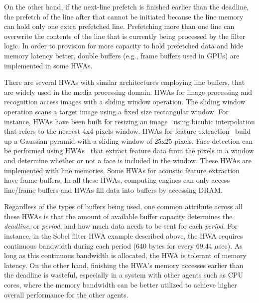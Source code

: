 \documentclass[10pt,letterpaper]{article}
\newcommand{\TMP}[1]{#1}
\newif\ifSQUEEZE
\begin{document}
On the other hand, if the next-line prefetch is finished earlier
than the deadline, the prefetch of the line after that cannot be
initiated because the line memory can hold only one extra
prefetched line. Prefetching more than one line can overwrite the
contents of the line that is currently being processed by the
filter logic. 
\TMP{In order to provision for more capacity to hold prefetched
data and hide memory latency better, double buffers (e.g., frame buffers used in
GPUs) are implemented in some HWAs.}


\ifSQUEEZE
There are several HWAs with similar architectures employing line/frame
buffers, which are widely used in the media processing domain. 
HWAs for resizing an image~\cite{resizing} or feature extraction~\cite{HWA_sift,HWA_face}
use line buffers. HWAs for acoustic feature extraction~\cite{HWA_acoustic} use frame buffers. 
In all these HWAs, computing engines can only access line/frame
buffers and data is prefetched into these buffers from main
memory.
\else
There are several HWAs with similar architectures employing line buffers, that
are widely used in the media processing domain. HWAs for image processing and
recognition access images with a sliding window operation. The sliding window
operation scans a target image using a fixed size rectangular window. For
instance, HWAs have been built for resizing an image~\cite{resizing} using
bicubic interpolation that refers to the nearest 4x4 pixels window. HWAs for
feature extraction~\cite{HWA_sift} build up a Gaussian pyramid with a sliding
window of 25x25 pixels. Face detection can be performed using
HWAs~\cite{HWA_face} that extract feature data from the pixels in a window and
determine whether or not a face is included in the window. These HWAs are
implemented with line memories. Some HWAs for acoustic feature
extraction~\cite{HWA_acoustic} have frame buffers. In all these HWAs, computing
engines can only access line/frame buffers and HWAs fill data into buffers by
accessing DRAM.
\fi

Regardless of the types of buffers being used, one common
attribute across all these HWAs is that the amount of available
buffer capacity determines the \emph{deadline}, or \emph{period}, and how much
data needs to be sent for each \emph{period}. For instance, in
the Sobel filter HWA example described above, the HWA requires
continuous bandwidth during each period (640 bytes for every 69.44
$\mu$sec). As long as this continuous bandwidth is allocated,
the HWA is tolerant of memory latency. On the other hand, finishing the
HWA's memory accesses earlier than the deadline is wasteful,
\TMP{especially in a system with other agents such as CPU cores, where
the memory bandwidth can be better utilized to achieve higher
overall performance for the other agents.}
\end{document}
